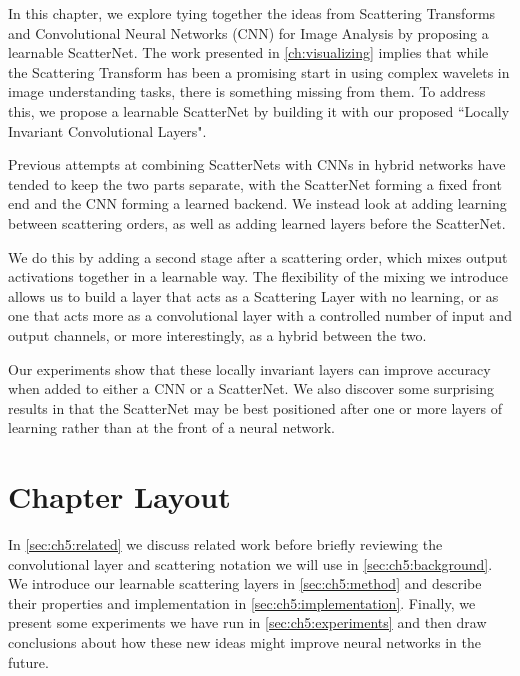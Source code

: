 In this chapter, we explore tying together the ideas from Scattering Transforms
and Convolutional Neural Networks (CNN) for Image Analysis by proposing a learnable
ScatterNet. The work presented in \autoref{ch:visualizing} implies that while the Scattering 
Transform has been a promising start in using complex wavelets in image
understanding tasks, there is something missing from them. To address this, we
propose a learnable ScatterNet by building it with our proposed ``Locally Invariant
Convolutional Layers".

Previous attempts at combining ScatterNets with CNNs in hybrid networks
\cite{oyallon_scaling_2017, oyallon_hybrid_2017, singh_scatternet_2018} have
tended to keep the two parts separate, with the ScatterNet forming a fixed front
end and the CNN forming a learned backend. We instead look at adding learning
between scattering orders, as well as adding learned layers before the
ScatterNet. 

%
We do this by adding a second stage after a scattering order, which mixes output
activations together in a learnable way. The flexibility of the mixing we introduce allows
us to build a layer that acts as a Scattering Layer with no learning, or
as one that acts more as a convolutional layer with a controlled number of input
and output channels, or more interestingly, as a hybrid between the two. 

Our experiments show that these locally invariant layers can improve
accuracy when added to either a CNN or a ScatterNet.  We also discover some
surprising results in that the ScatterNet may be best positioned after one or
more layers of learning rather than at the front of a neural network.

\section{Chapter Layout}
In \autoref{sec:ch5:related} we discuss related work before briefly 
reviewing the convolutional layer and scattering notation we will use in \autoref{sec:ch5:background}.
We introduce our learnable scattering layers in \autoref{sec:ch5:method} and describe their
properties and implementation in \autoref{sec:ch5:implementation}.
Finally, we present some experiments we have run in \autoref{sec:ch5:experiments} and then
draw conclusions about how these new ideas might improve neural networks in the
future.
